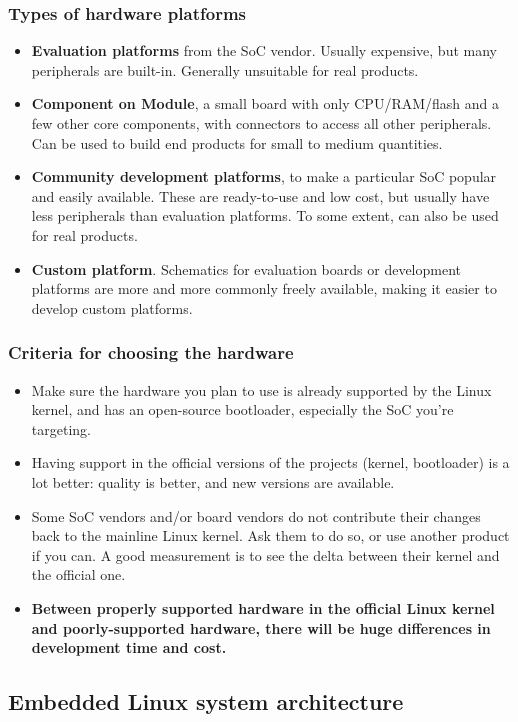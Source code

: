\begin{frame}
  \frametitle{Types of hardware platforms}
  \begin{itemize}
  \item {\bf Evaluation platforms} from the SoC vendor. Usually
    expensive, but many peripherals are built-in. Generally unsuitable
    for real products.
  \item {\bf Component on Module}, a small board with only
    CPU/RAM/flash and a few other core components, with connectors to
    access all other peripherals. Can be used to build end products
    for small to medium quantities.
  \item {\bf Community development platforms}, to make a
    particular SoC popular and easily available. These are
    ready-to-use and low cost, but usually have less peripherals than
    evaluation platforms. To some extent, can also be used for real
    products.
  \item {\bf Custom platform}. Schematics for evaluation boards or
    development platforms are more and more commonly freely available,
    making it easier to develop custom platforms.
\end{itemize}
\end{frame}

\begin{frame}
  \frametitle{Criteria for choosing the hardware}
  \begin{itemize}
  \item Make sure the hardware you plan to use is already supported by
    the Linux kernel, and has an open-source bootloader, especially
    the SoC you’re targeting.
  \item Having support in the official versions of the projects
    (kernel, bootloader) is a lot better: quality is better, and new
    versions are available.
  \item Some SoC vendors and/or board vendors do not contribute their
    changes back to the mainline Linux kernel. Ask them to do so, or
    use another product if you can. A good measurement is to see the
    delta between their kernel and the official one.
  \item {\bf Between properly supported hardware in the official Linux
      kernel and poorly-supported hardware, there will be huge
      differences in development time and cost.}
  \end{itemize}
\end{frame}

\subsection{Embedded Linux system architecture}

